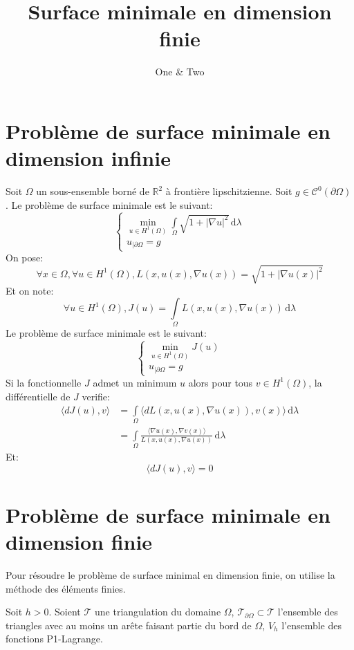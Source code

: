 \documentclass[a4paper, 11pt]{article}
\author{One \& Two}
\title{Surface minimale en dimension finie}
\begin{document}
\maketitle
\newpage

\section{Probl\`eme de surface minimale en dimension infinie}
Soit $\Omega$ un sous-ensemble born\'e de $\mathbb{R}^2$ \`a fronti\`ere
 lipschitzienne. Soit $g\in\mathcal{C}^0(\partial\Omega)$. Le probl\`eme de
 surface minimale est le suivant:
\begin{equation}
\begin{cases}
\min\limits_{u\in H^1(\Omega)}\int\limits_\Omega\sqrt{1+|\nabla u|^2}\,
\mathrm{d}\lambda \\
u_{|\partial\Omega}=g
\end{cases}
\end{equation}
On pose:
$$
\forall x\in\Omega, \forall u\in H^1(\Omega), L(x, u(x), \nabla u(x))=
\sqrt{1+|\nabla u(x)|^2}
$$
Et on note:
$$
\forall u\in H^1(\Omega), J(u)=\int\limits_\Omega L(x, u(x), \nabla u(x))
\,\mathrm{d}\lambda
$$
Le probl\`eme de surface minimale est le suivant:
\begin{equation}
\begin{cases}
\min\limits_{u\in H^1(\Omega)}J(u) \\
u_{|\partial\Omega}=g
\end{cases}
\end{equation}
Si la fonctionnelle $J$ admet un minimum $u$ alors pour tous $v\in H^1(\Omega)$,
 la diff\'erentielle de $J$ verifie:
\begin{align*}
\langle dJ(u), v\rangle &= \int\limits_\Omega\langle dL(x, u(x), \nabla u(x)),
v(x)\rangle\,\mathrm{d}\lambda \\
&= \int\limits_\Omega\frac{\langle \nabla u(x), \nabla v(x)\rangle}{L(x, u(x),
 \nabla u(x))}\,\mathrm{d}\lambda
\end{align*}
Et:
$$
\langle dJ(u), v\rangle = 0
$$
\newpage
\section{Probl\`eme de surface minimale en dimension finie}
Pour r\'esoudre le probl\`eme de surface minimal en dimension finie, on utilise
 la m\'ethode des \'el\'ements finies.

Soit $h>0$. Soient $\mathcal{T}$ une triangulation du domaine $\Omega$,
 $\mathcal{T}_{\partial\Omega}\subset\mathcal{T}$ l'ensemble des triangles avec
 au moins un ar\^ete faisant partie du bord de $\Omega$, $V_h$
 l'ensemble des fonctions P1-Lagrange.
\end{document}
